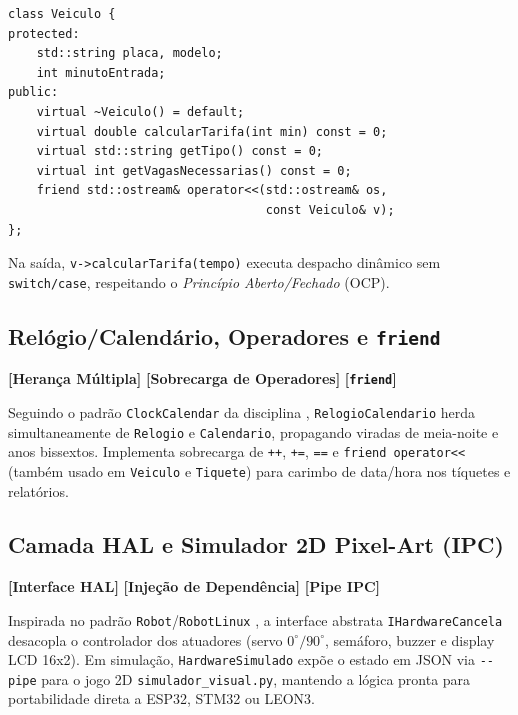 \documentclass[10pt,twocolumn,a4paper]{article}
\newcommand{\code}[1]{\texttt{\footnotesize #1}}
\newcommand{\conceptbadge}[1]{\textbf{\color{ufscBlue}[#1]}}
\begin{document}
\begin{lstlisting}[label={lst:veic}, caption={Classe abstrata \code{Veiculo} com despacho por \textit{vtable}.}]
class Veiculo {
protected:
    std::string placa, modelo;
    int minutoEntrada;
public:
    virtual ~Veiculo() = default;
    virtual double calcularTarifa(int min) const = 0;
    virtual std::string getTipo() const = 0;
    virtual int getVagasNecessarias() const = 0;
    friend std::ostream& operator<<(std::ostream& os,
                                    const Veiculo& v);
};
\end{lstlisting}

Na saída, \code{v->calcularTarifa(tempo)} executa despacho dinâmico sem \code{switch/case}, respeitando o \textit{Princípio Aberto/Fechado} (OCP).

\subsection{Relógio/Calendário, Operadores e \code{friend}}

\conceptbadge{Herança Múltipla} \conceptbadge{Sobrecarga de Operadores} \conceptbadge{\code{friend}}

Seguindo o padrão \code{ClockCalendar} da disciplina \cite{bezerra2026eel7323}, \code{RelogioCalendario} herda simultaneamente de \code{Relogio} e \code{Calendario}, propagando viradas de meia-noite e anos bissextos. Implementa sobrecarga de \code{++}, \code{+=}, \code{==} e \code{friend operator<{}<} (também usado em \code{Veiculo} e \code{Tiquete}) para carimbo de data/hora nos tíquetes e relatórios.

\subsection{Camada HAL e Simulador 2D Pixel-Art (IPC)}

\conceptbadge{Interface HAL} \conceptbadge{Injeção de Dependência} \conceptbadge{Pipe IPC}

Inspirada no padrão \code{Robot}/\code{RobotLinux} \cite{bezerra2026eel7323}, a interface abstrata \code{IHardwareCancela} desacopla o controlador dos atuadores (servo $0^\circ/90^\circ$, semáforo, buzzer e display LCD 16x2). Em simulação, \code{HardwareSimulado} expõe o estado em JSON via \code{-{}-pipe} para o jogo 2D \code{simulador\_visual.py}, mantendo a lógica pronta para portabilidade direta a ESP32, STM32 ou LEON3.
\end{document}
